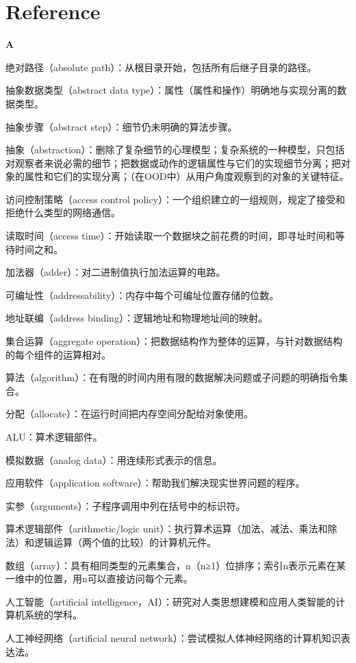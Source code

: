 \part{Reference}

\textbf{A}

绝对路径（absolute path）：从根目录开始，包括所有后继子目录的路径。

抽象数据类型（abstract data type）：属性（属性和操作）明确地与实现分离的数据类型。

抽象步骤（abstract step）：细节仍未明确的算法步骤。

抽象（abstraction）：删除了复杂细节的心理模型；复杂系统的一种模型，只包括对观察者来说必需的细节；把数据或动作的逻辑属性与它们的实现细节分离；把对象的属性和它们的实现分离；（在OOD中）从用户角度观察到的对象的关键特征。

访问控制策略（access control policy）：一个组织建立的一组规则，规定了接受和拒绝什么类型的网络通信。

读取时间（access time）：开始读取一个数据块之前花费的时间，即寻址时间和等待时间之和。

加法器（adder）：对二进制值执行加法运算的电路。

可编址性（addressability）：内存中每个可编址位置存储的位数。

地址联编（address binding）：逻辑地址和物理地址间的映射。

集合运算（aggregate operation）：把数据结构作为整体的运算，与针对数据结构的每个组件的运算相对。

算法（algorithm）：在有限的时间内用有限的数据解决问题或子问题的明确指令集合。

分配（allocate）：在运行时间把内存空间分配给对象使用。

ALU：算术逻辑部件。

模拟数据（analog data）：用连续形式表示的信息。

应用软件（application software）：帮助我们解决现实世界问题的程序。

实参（arguments）：子程序调用中列在括号中的标识符。

算术逻辑部件（arithmetic/logic unit）：执行算术运算（加法、减法、乘法和除法）和逻辑运算（两个值的比较）的计算机元件。

数组（array）：具有相同类型的元素集合，n（n≥1）位排序；索引n表示元素在某一维中的位置，用n可以直接访问每个元素。

人工智能（artificial intelligence，AI）：研究对人类思想建模和应用人类智能的计算机系统的学科。

人工神经网络（artificial neural network）：尝试模拟人体神经网络的计算机知识表达法。

